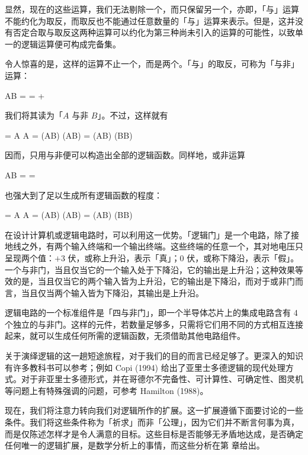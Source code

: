 显然，现在的这些运算，我们无法剔除一个，而只保留另一个，亦即，「与」运算不能约化为取反，而取反也不能通过任意数量的「与」运算来表示。但是，这并没有否定合取与取反这两种运算可以约化为第三种尚未引入的运算的可能性，以致单一的逻辑运算便可构成完备集。

令人惊喜的是，这样的运算不止一个，而是两个。「与」的取反，可称为「与非」运算：

\placeformula
\startformula
A\uparrow B =  =  + 
\stopformula

我们将其读为「$A$ 与非 $B$」。不过，这样就有

\placeformula
\startformula
\startalign
\NC {} \NC = A \uparrow A\NR
\NC {} \NC = (A\uparrow B) \uparrow (A\uparrow B)\NR
\NC {} \NC = (A\uparrow B) \uparrow (B\uparrow B)\NR
\stopalign
\stopformula

因而，只用与非便可以构造出全部的逻辑函数。同样地，或非运算

\placeformula
\startformula
A\downarrow B =  = 
\stopformula

也强大到了足以生成所有逻辑函数的程度：

\placeformula
\startformula
\startalign
\NC {} \NC = A \downarrow A\NR
\NC {} \NC = (A\downarrow B) \downarrow (A\downarrow B)\NR
\NC {} \NC = (A\downarrow B) \uparrow (B\downarrow B)\NR
\stopalign
\stopformula

在设计计算机或逻辑电路时，可以利用这一优势。「逻辑门」是一个电路，除了接地线之外，有两个输入终端和一个输出终端。这些终端的任意一个，其对地电压只呈现两个值：$+3$ 伏，或称上升沿，表示「真」；$0$ 伏，或称下降沿，表示「假」。一个与非门，当且仅当它的一个输入处于下降沿，它的输出是上升沿；这种效果等效的是，当且仅当它的两个输入皆为上升沿，它的输出是下降沿，而对于或非门而言，当且仅当两个输入皆为下降沿，其输出是上升沿。

逻辑电路的一个标准组件是「四与非门」，即一个半导体芯片上的集成电路含有 4 个独立的与非门。这样的元件，若数量足够多，只需将它们用不同的方式相互连接起来，就可以生成任何所需的逻辑函数，无须借助其他电路组件。

关于演绎逻辑的这一趟短途旅程，对于我们的目的而言已经足够了。更深入的知识有许多教科书可以参考；例如 Copi (1994) 给出了亚里士多德逻辑的现代处理方式。对于非亚里士多德形式，并在哥德尔不完备性、可计算性、可确定性、图灵机等问题上有特殊强调的问题，可参考 Hamilton (1988)。

现在，我们将注意力转向我们对逻辑所作的扩展。这一扩展遵循下面要讨论的一些条件。我们将这些条件称为「祈求」而非「公理」，因为它们并不断言何事为真，而是仅陈述怎样才是令人满意的目标。这些目标是否能够无矛盾地达成，是否确定任何唯一的逻辑扩展，是数学分析上的事情，而这些分析在第  章给出。


